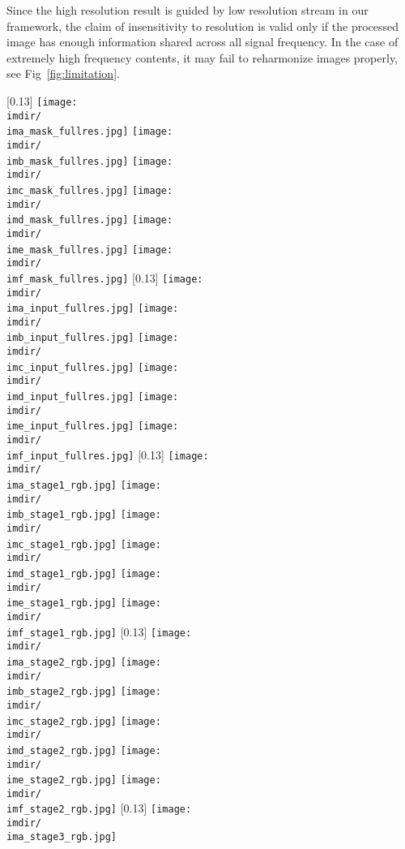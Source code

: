 \documentclass[runningheads]{llncs}
\begin{document}
Since the high resolution result is guided by low resolution stream in our framework, the claim of insensitivity to resolution is valid only if the processed image has enough information shared across all signal frequency. 
In the case of extremely high frequency contents, it may fail to reharmonize images properly, see Fig~\ref{fig:limitation}.



\newcommand{\imdir}{figures/intermediate_result_supp/}
\newcommand{\ima}{f2598_1_2}
\newcommand{\imb}{f1570_1_1}
\newcommand{\imc}{a3163_1_1}
\newcommand{\imd}{a0041_1_5}
\newcommand{\ime}{a0782_1_4}
\newcommand{\imf}{a3427_1_4}

\begin{figure*}[hthb]
\centering


[0.13\linewidth]
{
\texttt{[image: \\imdir/\\ima\_mask\_fullres.jpg]}
\texttt{[image: \\imdir/\\imb\_mask\_fullres.jpg]}
\texttt{[image: \\imdir/\\imc\_mask\_fullres.jpg]}
\texttt{[image: \\imdir/\\imd\_mask\_fullres.jpg]}
\texttt{[image: \\imdir/\\ime\_mask\_fullres.jpg]}
\texttt{[image: \\imdir/\\imf\_mask\_fullres.jpg]}
}
[0.13\linewidth]
{
\texttt{[image: \\imdir/\\ima\_input\_fullres.jpg]}
\texttt{[image: \\imdir/\\imb\_input\_fullres.jpg]}
\texttt{[image: \\imdir/\\imc\_input\_fullres.jpg]}
\texttt{[image: \\imdir/\\imd\_input\_fullres.jpg]}
\texttt{[image: \\imdir/\\ime\_input\_fullres.jpg]}
\texttt{[image: \\imdir/\\imf\_input\_fullres.jpg]}
}
[0.13\linewidth]
{
\texttt{[image: \\imdir/\\ima\_stage1\_rgb.jpg]}
\texttt{[image: \\imdir/\\imb\_stage1\_rgb.jpg]}
\texttt{[image: \\imdir/\\imc\_stage1\_rgb.jpg]}
\texttt{[image: \\imdir/\\imd\_stage1\_rgb.jpg]}
\texttt{[image: \\imdir/\\ime\_stage1\_rgb.jpg]}
\texttt{[image: \\imdir/\\imf\_stage1\_rgb.jpg]}
}
[0.13\linewidth]
{
\texttt{[image: \\imdir/\\ima\_stage2\_rgb.jpg]}
\texttt{[image: \\imdir/\\imb\_stage2\_rgb.jpg]}
\texttt{[image: \\imdir/\\imc\_stage2\_rgb.jpg]}
\texttt{[image: \\imdir/\\imd\_stage2\_rgb.jpg]}
\texttt{[image: \\imdir/\\ime\_stage2\_rgb.jpg]}
\texttt{[image: \\imdir/\\imf\_stage2\_rgb.jpg]}
}
[0.13\linewidth]
{
\texttt{[image: \\imdir/\\ima\_stage3\_rgb.jpg]}
}
\end{figure*}
\end{document}
